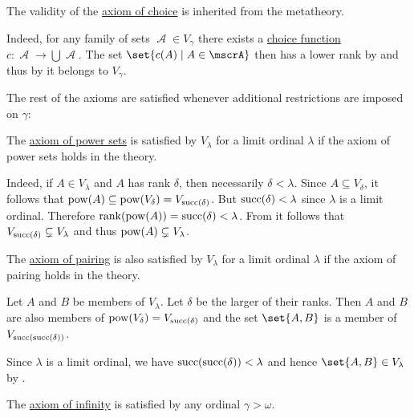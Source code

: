 \begin{remark}
\begin{thmenum}[series=remark:cumulative_hierarchy_model_of_zfcu]
     The validity of the \hyperref[def:zfc/choice]{axiom of choice} is inherited from the metatheory.

    Indeed, for any family of sets \( \mscrA \in V_\gamma \) there exists a \hyperref[def:choice_function]{choice function} \( c: \mscrA \to \bigcup \mscrA \). The set \( \set{ c(A) \given A \in \mscrA } \) then has a lower rank by  and thus by  it belongs to \( V_\gamma \).
  \end{thmenum}

  The rest of the axioms are satisfied whenever additional restrictions are imposed on \( \gamma \):
  \begin{thmenum}[series=remark:cumulative_hierarchy_model_of_zfcu]
     The \hyperref[def:zfc/power_set]{axiom of power sets} is satisfied by \( V_\lambda \) for a limit ordinal \( \lambda \) if the axiom of power sets holds in the theory.

    Indeed, if \( A \in V_\lambda \) and \( A \) has rank \( \delta \), then necessarily \( \delta < \lambda \). Since \( A \subseteq V_\delta \), it follows that \( \operatorname{pow}(A) \subseteq \operatorname{pow}(V_\delta) = V_{\operatorname{succ}(\delta)} \). But \( \operatorname{succ}(\delta) < \lambda \) since \( \lambda \) is a limit ordinal. Therefore \( \operatorname{rank}(\operatorname{pow}(A)) = \operatorname{succ}(\delta) < \lambda \). From  it follows that \( V_{\operatorname{succ}(\delta)} \subsetneq V_\lambda \) and thus \( \operatorname{pow}(A) \subsetneq V_\lambda \).

     The \hyperref[def:zfc/pairing]{axiom of pairing} is also satisfied by \( V_\lambda \) for a limit ordinal \( \lambda \) if the axiom of pairing holds in the theory.

    Let \( A \) and \( B \) be members of \( V_\lambda \). Let \( \delta \) be the larger of their ranks. Then \( A \) and \( B \) are also members of \( \operatorname{pow}(V_\delta) = V_{\operatorname{succ}(\delta)} \) and the set \( \set{ A, B } \) is a member of \( V_{\operatorname{succ}(\operatorname{succ}(\delta))} \).

    Since \( \lambda \) is a limit ordinal, we have \( \operatorname{succ}(\operatorname{succ}(\delta)) < \lambda \) and hence \( \set{ A, B } \in V_\lambda \) by .

     The \hyperref[def:zfc/infinity]{axiom of infinity} is satisfied by any ordinal \( \gamma > \omega \).


\end{thmenum}
\end{remark}

